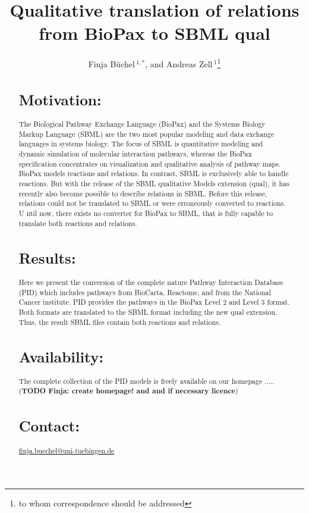 \documentclass{bioinfo}
\begin{document}

\title[BioPax to SBML qual]{Qualitative translation of relations from BioPax to SBML qual}
\author[B\"uchel \textit{et~al}]{Finja B\"uchel\,$^{1,*}$,
and Andreas Zell\,$^1$\footnote{to whom correspondence should be addressed}}
\address{$^{1}$Department of Cognitive Systems, University of Tuebingen, Sand 1, 72076 T\"ubingen, Germany\\}




\maketitle

\begin{abstract}

\section{Motivation:}
The Biological Pathway Exchange Language (BioPax) and the Systems Biology Markup Language (SBML) are the two most popular modeling and data exchange languages in systems biology.
The focus of SBML is quantitative modeling and dynamic simulation of molecular interaction pathways, whereas the BioPax specification concentrates on visualization and qualitative analysis of pathway maps.
BioPax models reactions and relations. In contrast, SBML is exclusively able to handle reactions.
But with the release of the SBML qualitative Models extension (qual), it has recently also become possible to describe relations in SBML.
Before this release, relations could not be translated to SBML or were erroneously converted to reactions. U
ntil now, there exists no converter for BioPax to SBML, that is fully capable to translate both reactions and relations.
\section{Results:}
Here we present the conversion of the complete nature Pathway Interaction Database (PID) which includes pathways from BioCarta, Reactome, and from the National Cancer institute.
PID provides the pathways in the BioPax Level 2 and Level 3 format.
Both formats are translated to the SBML format including the new qual extension.
Thus, the result SBML files contain both reactions and relations.
\section{Availability:}
The complete collection of the PID models is freely available on our homepage ..... (\textbf{TODO Finja: create homepage! and and if necessary licence})
\section{Contact:} \href{finja.buechel@uni-tuebingen.de}{finja.buechel@uni-tuebingen.de}
\end{abstract}
\end{document}
